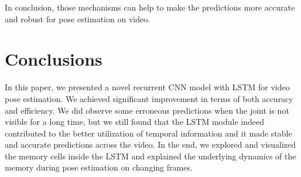 \documentclass[10pt,twocolumn,letterpaper]{article}
\begin{document}
In conclusion, those mechanisms can help to make the predictions more accurate and robust for pose estimation on video.




\section{Conclusions}
\vspace{-5pt}
In this paper, we presented a novel recurrent CNN model with LSTM for video pose estimation. We achieved significant improvement in terms of both accuracy and efficiency. We did observe some erroneous predictions when the joint is not visible for a long time, but we still found that the LSTM module indeed contributed to the better utilization of temporal information and it made stable and accurate predictions across the video. In the end, we explored and visualized the memory cells inside the LSTM and explained the underlying dynamics of the memory during pose estimation on changing frames.


{\small


}
\end{document}

